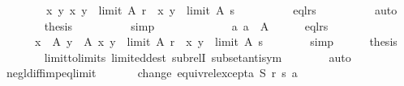 \begin{isabellebody}
\isanewline
\ \ \ \ \ \ \ \ {\isachardoublequoteopen}{\isasymforall}x\ y{\isachardot}{\kern0pt}\ {\isacharparenleft}{\kern0pt}x{\isacharcomma}{\kern0pt}\ y{\isacharparenright}{\kern0pt}\ {\isasymin}\ limit\ A\ r\ {\isasymlongleftrightarrow}\ {\isacharparenleft}{\kern0pt}x{\isacharcomma}{\kern0pt}\ y{\isacharparenright}{\kern0pt}\ {\isasymin}\ limit\ A\ s{\isachardoublequoteclose}\isanewline
\ \ \ \ \ \ \ \ \isamarkupfalse%
\ eql{\isacharunderscore}{\kern0pt}rs\isanewline
\ \ \ \ \ \ \ \ \isamarkupfalse%
\ auto\isanewline
\ \ \ \ \ \ \isamarkupfalse%
\ {\isacharquery}{\kern0pt}thesis\isanewline
\ \ \ \ \ \ \ \ \isamarkupfalse%
\ simp\isanewline
\ \ \ \ \isamarkupfalse%
\isanewline
\ \ \isamarkupfalse%
\isanewline
\ \ \ \ \isamarkupfalse%
\ a{}{\isacharcolon}{\kern0pt}\ {\isachardoublequoteopen}a\ {\isasymnotin}\ A{\isachardoublequoteclose}\isanewline
\ \ \ \ \isamarkupfalse%
\ eql{\isacharunderscore}{\kern0pt}rs\ \isamarkupfalse%
\isanewline
\ \ \ \ \ \ {\isachardoublequoteopen}{\isasymforall}x\ {\isasymin}\ A{\isachardot}{\kern0pt}\ {\isasymforall}y\ {\isasymin}\ A{\isachardot}{\kern0pt}\ {\isacharparenleft}{\kern0pt}x{\isacharcomma}{\kern0pt}\ y{\isacharparenright}{\kern0pt}\ {\isasymin}\ {\isacharparenleft}{\kern0pt}limit\ A\ r{\isacharparenright}{\kern0pt}\ {\isasymlongleftrightarrow}\ {\isacharparenleft}{\kern0pt}x{\isacharcomma}{\kern0pt}\ y{\isacharparenright}{\kern0pt}\ {\isasymin}\ {\isacharparenleft}{\kern0pt}limit\ A\ s{\isacharparenright}{\kern0pt}{\isachardoublequoteclose}\isanewline
\ \ \ \ \ \ \isamarkupfalse%
\ simp\isanewline
\ \ \ \ \isamarkupfalse%
\ {\isacharquery}{\kern0pt}thesis\isanewline
\ \ \ \ \ \ \isamarkupfalse%
\ limit{\isacharunderscore}{\kern0pt}to{\isacharunderscore}{\kern0pt}limits\ limited{\isacharunderscore}{\kern0pt}dest\ subrelI\ subset{\isacharunderscore}{\kern0pt}antisym\isanewline
\ \ \ \ \ \ \isamarkupfalse%
\ auto\isanewline
\ \ \isamarkupfalse%
\isanewline
{}\isamarkupfalse%
%
\endisatagproof
{\isafoldproof}%
%
\isadelimproof
\isanewline
%
\endisadelimproof
\isanewline
{}\isamarkupfalse%
\ negl{\isacharunderscore}{\kern0pt}diff{\isacharunderscore}{\kern0pt}imp{\isacharunderscore}{\kern0pt}eq{\isacharunderscore}{\kern0pt}limit{\isacharcolon}{\kern0pt}\isanewline
\ \ \isanewline
\ \ \ \ change{\isacharcolon}{\kern0pt}\ {\isachardoublequoteopen}equiv{\isacharunderscore}{\kern0pt}rel{\isacharunderscore}{\kern0pt}except{\isacharunderscore}{\kern0pt}a\ S\ r\ s\ a{\isachardoublequoteclose}\ \isanewline

\end{isabellebody}

